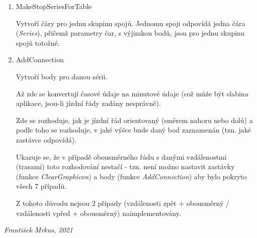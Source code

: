 \documentclass[14pt]{article}
\begin{document}
\begin{enumerate}
\begin{enumerate}
\item MakeStopSeriesForTable

Vytvoří čáry pro jednu skupinu spojů. Jednomu spoji odpovídá jedna čára (\textit{Series}), přičemž parametry čar, s výjimkou bodů, jsou pro jednu skupinu spojů totožné.

\item AddConnection

Vytvoří body pro danou sérii.

Až zde se konvertují časové údaje na minutové údaje (což může být slabina aplikace, jsou-li jízdní řády zadány nesprávně).

Zde se rozhoduje, jak je jízdní řád orientovaný (směrem nahoru nebo dolů) a podle toho se rozhoduje, v jaké výšce bude daný bod zaznamenán (tzn. jaké zastávce odpovídá). 

Ukazuje se, že v případě obousměrného řádu s danými vzdálenostmi (trasami) toto rozhodování nestačí - tzn. není možno nastavit zastávky (funkce \textit{ClearGraphicon}) a body (funkce \textit{AddConnection}) aby bylo pokryto všech 7 případů.

Z tohoto důvodu nejsou 2 případy (vzdálenosti zpět + obousměrný / vzdálenosti vpřed + obousměrný) naimplementovány.

\end{enumerate}

\end{enumerate}

\textit{František Mrkus, 2021}
\end{document}
